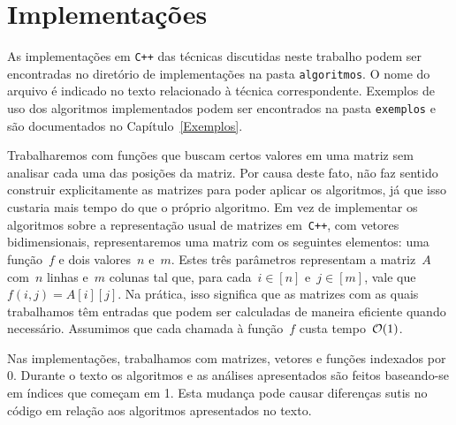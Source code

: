\section{Implementações} \label{Intro:impl}
As implementações em \texttt{C++} das técnicas discutidas neste trabalho podem ser encontradas no diretório de implementações na pasta \texttt{algoritmos}. O nome do arquivo é indicado no texto relacionado à técnica correspondente. Exemplos de uso dos algoritmos implementados podem ser encontrados na pasta \texttt{exemplos} e são documentados no Capítulo~\ref{Exemplos}.

Trabalharemos com funções que buscam certos valores em uma matriz sem analisar cada uma das posições da matriz. Por causa deste fato, não faz sentido construir explicitamente as matrizes para poder aplicar os algoritmos, já que isso custaria mais tempo do que o próprio algoritmo. Em vez de implementar os algoritmos sobre a representação usual de matrizes em~\texttt{C++}, com vetores bidimensionais, representaremos uma matriz com os seguintes elementos: uma função~$f$ e dois valores~$n$ e~$m$. Estes três parâmetros representam a matriz~$A$ com~$n$ linhas e~$m$ colunas tal que, para cada~${ i \in [n] }$ e~${ j \in [m] }$, vale que~${ f(i,j) = A[i][j] }$. Na prática, isso significa que as matrizes com as quais trabalhamos têm entradas que podem ser calculadas de maneira eficiente quando necessário. Assumimos que cada chamada à função~$f$ custa tempo~$\mathcal{O}(1)$.

Nas implementações, trabalhamos com matrizes, vetores e funções indexados por 0. Durante o texto os algoritmos e as análises apresentados são feitos baseando-se em índices que começam em 1. Esta mudança pode causar diferenças sutis no código em relação aos algoritmos apresentados no texto.
